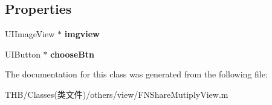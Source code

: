 \subsection*{Properties}
\begin{DoxyCompactItemize}
\item 
\mbox{\label{interface_f_n_share_mutiply_cell_ae093ac18834dbe73cc25a824fedb1541}} 
U\+I\+Image\+View $\ast$ {\bfseries imgview}
\item 
\mbox{\label{interface_f_n_share_mutiply_cell_a25fe217410381e14fcd457998b3707b2}} 
U\+I\+Button $\ast$ {\bfseries choose\+Btn}
\end{DoxyCompactItemize}


The documentation for this class was generated from the following file\+:\begin{DoxyCompactItemize}
\item 
T\+H\+B/\+Classes(类文件)/others/view/F\+N\+Share\+Mutiply\+View.\+m\end{DoxyCompactItemize}
